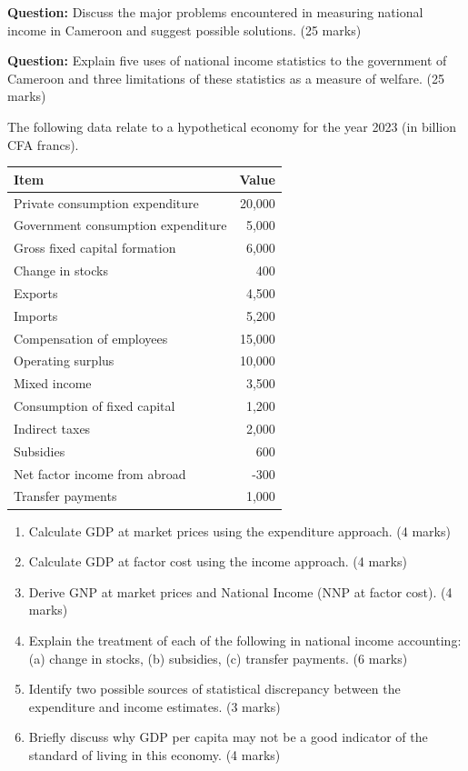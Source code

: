 \documentclass[11pt]{article}
\begin{document}
\begin{exercice}
\textbf{Question:} Discuss the major problems encountered in measuring national income in Cameroon and suggest possible solutions. (25 marks)
\end{exercice}

\begin{exercice}
\textbf{Question:} Explain five uses of national income statistics to the government of Cameroon and three limitations of these statistics as a measure of welfare. (25 marks)
\end{exercice}

\begin{exercice}
The following data relate to a hypothetical economy for the year 2023 (in billion CFA francs).
\begin{center}
\begin{tabular}{|l|r|}
\hline
\textbf{Item} & \textbf{Value} \\
\hline
Private consumption expenditure & 20,000 \\
Government consumption expenditure & 5,000 \\
Gross fixed capital formation & 6,000 \\
Change in stocks & 400 \\
Exports & 4,500 \\
Imports & 5,200 \\
Compensation of employees & 15,000 \\
Operating surplus & 10,000 \\
Mixed income & 3,500 \\
Consumption of fixed capital & 1,200 \\
Indirect taxes & 2,000 \\
Subsidies & 600 \\
Net factor income from abroad & -300 \\
Transfer payments & 1,000 \\
\hline
\end{tabular}
\end{center}
\begin{enumerate}
\item Calculate GDP at market prices using the expenditure approach. (4 marks)
\item Calculate GDP at factor cost using the income approach. (4 marks)
\item Derive GNP at market prices and National Income (NNP at factor cost). (4 marks)
\item Explain the treatment of each of the following in national income accounting: (a) change in stocks, (b) subsidies, (c) transfer payments. (6 marks)
\item Identify two possible sources of statistical discrepancy between the expenditure and income estimates. (3 marks)
\item Briefly discuss why GDP per capita may not be a good indicator of the standard of living in this economy. (4 marks)
\end{enumerate}
\end{exercice}
\end{document}
